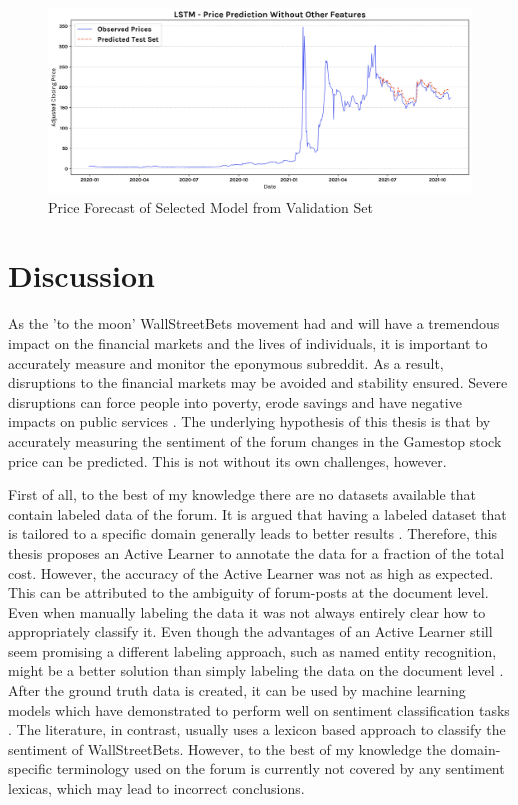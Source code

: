 \documentclass[11pt, a4paper]{article}
\begin{document}
\begin{figure}[!ht]
    \centering
    \includegraphics[scale=0.4]{no_other_feature_pred.png}
    \caption{Price Forecast of Selected Model from Validation Set}
    \label{fig:price_forecast_best_model}
\end{figure}


\newpage
\section{Discussion}

As the 'to the moon' WallStreetBets movement had and will have a tremendous impact on the financial markets
and the lives of individuals, it is important to accurately measure and monitor the eponymous subreddit.
As a result, disruptions to the financial markets may be avoided and stability ensured.
Severe disruptions can force people into poverty, erode savings and have negative impacts on public services \citep{robe2013markets}.
The underlying hypothesis of this thesis is that by accurately measuring the sentiment of the forum changes in the Gamestop stock price can be predicted.
This is not without its own challenges, however.

First of all, to the best of my knowledge there are no datasets available that contain labeled data of the forum. It is
argued that having a labeled dataset that is tailored to a specific domain generally leads to better results \citep{park2015EfficientExtraction}.
Therefore, this thesis proposes an Active Learner to annotate the data for a fraction of the total cost.
However, the accuracy of the Active Learner was not as high as expected.
This can be attributed to the ambiguity of forum-posts at the document level.
Even when manually labeling the data it was not always entirely clear how to appropriately classify it. 
Even though the advantages of an Active Learner still seem promising a different labeling approach, such as
named entity recognition, might be a better solution than simply labeling the data on the document level \citep{stanislawek2019named}.\\
After the ground truth data is created, it can be used by machine learning models which have demonstrated to perform well on sentiment
classification tasks \citep{Lagrari2021, fu2018lexiconenhancedlstm}.
The literature, in contrast, usually uses a lexicon based approach to classify the sentiment of WallStreetBets.
However, to the best of my knowledge the domain-specific terminology used on the forum is currently not covered by any sentiment lexicas,
which may lead to incorrect conclusions.
\end{document}
